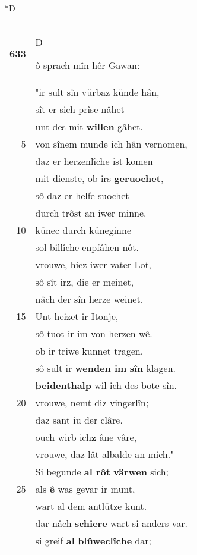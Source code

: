 \documentclass[8pt,a4paper,notitlepage]{article}
\begin{document}
\begin{table}[ht]
\begin{minipage}[t]{0.5\linewidth}
\small
\begin{center}*D
\end{center}
\begin{tabular}{rl}
\textbf{633} & \begin{large}D\end{large}ô sprach mîn hêr Gawan:\\ 
 & "ir sult sîn vürbaz künde hân,\\ 
 & sît er sich prîse nâhet\\ 
 & unt des mit \textbf{willen} gâhet.\\ 
5 & von sînem munde ich hân vernomen,\\ 
 & daz er herzenlîche ist komen\\ 
 & mit dienste, ob irs \textbf{geruochet},\\ 
 & sô daz er helfe suochet\\ 
 & durch trôst an iwer minne.\\ 
10 & künec durch küneginne\\ 
 & sol billîche enpfâhen nôt.\\ 
 & vrouwe, hiez iwer vater Lot,\\ 
 & sô sît irz, die er meinet,\\ 
 & nâch der sîn herze weinet.\\ 
15 & Unt heizet ir Itonje,\\ 
 & sô tuot ir im von herzen wê.\\ 
 & ob ir triwe kunnet tragen,\\ 
 & sô sult ir \textbf{wenden im} \textbf{sîn} klagen.\\ 
 & \textbf{beidenthalp} wil ich des bote sîn.\\ 
20 & vrouwe, nemt diz vingerlîn;\\ 
 & daz sant iu der clâre.\\ 
 & ouch wirb ich\textbf{z} âne vâre,\\ 
 & vrouwe, daz lât albalde an mich."\\ 
 & Si begunde \textbf{al rôt} \textbf{värwen} sich;\\ 
25 & als \textbf{ê} was gevar ir munt,\\ 
 & wart al dem antlütze kunt.\\ 
 & dar nâch \textbf{schiere} wart si anders var.\\ 
 & si greif \textbf{al} \textbf{blûweclîche} dar;\\ 

\end{tabular}
\end{minipage}
\end{table}
\end{document}
